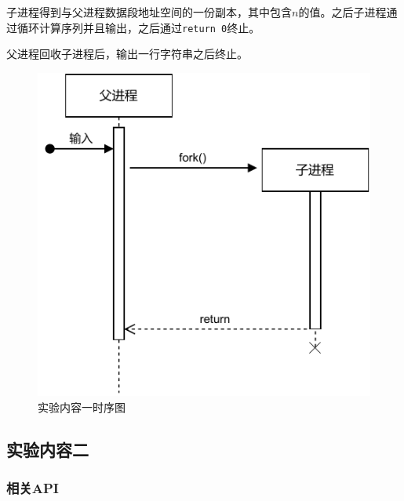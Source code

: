 \documentclass[lang=cn,11pt,a4paper,cite=authornum]{paper}
\begin{document}
子进程得到与父进程数据段地址空间的一份副本，其中包含$n$的值。之后子进程通过循环计算序列并且输出，之后通过\texttt{return 0}终止。

父进程回收子进程后，输出一行字符串之后终止。

\begin{figure}[htbp]

    \centering
    \includegraphics[width=0.6\linewidth]{./images/UML1.pdf}
    \caption{实验内容一时序图\label{fig:UML1}}

\end{figure}

\subsection{实验内容二}

\subsubsection{相关API}
\end{document}

